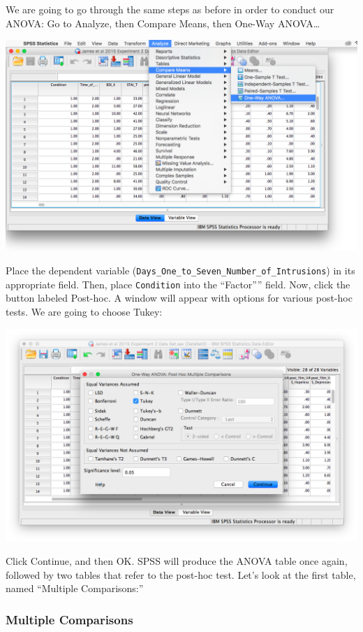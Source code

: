 \documentclass[
]{book}
\begin{document}
We are going to go through the same steps as before in order to conduct our ANOVA: Go to {Analyze}, then {Compare Means}, then {One-Way ANOVA\ldots{}}

\includegraphics{img/8.4.12.png}

Place the dependent variable (\texttt{Days\_One\_to\_Seven\_Number\_of\_Intrusions}) in its appropriate field. Then, place \texttt{Condition} into the ``Factor'''' field. Now, click the button labeled {Post-hoc}. A window will appear with options for various post-hoc tests. We are going to choose {Tukey}:

\includegraphics{img/8.4.20.png}

Click {Continue}, and then {OK}. SPSS will produce the ANOVA table once again, followed by two tables that refer to the post-hoc test. Let's look at the first table, named ``Multiple Comparisons:''

\hypertarget{multiple-comparisons}{%
\subsubsection{Multiple Comparisons}\label{multiple-comparisons}}
\end{document}
